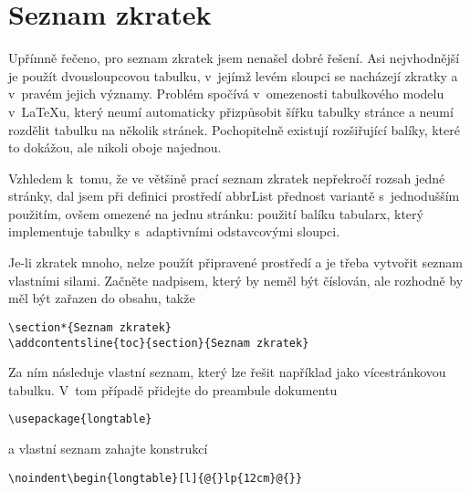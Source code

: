 \documentclass[FM,SP]{tulthesis}
\newcommand{\argument}[1]{{\ttfamily\color{\tulcolor}#1}}
\newenvironment{myquote}{\begin{list}{}{\setlength\leftmargin\parindent}\item[]}{\end{list}}
\newenvironment{listing}{\begin{myquote}\color{\tulcolor}}{\end{myquote}}
\begin{document}
\section{Seznam zkratek}\label{zkratky}

Upřímně řečeno, pro seznam zkratek jsem nenašel dobré řešení. Asi nejvhodnější
je použít dvousloupcovou tabulku, v~jejímž levém sloupci se nacházejí zkratky a
v~pravém jejich významy. Problém spočívá v~omezenosti tabulkového modelu
v~\LaTeX u, který neumí automaticky přizpůsobit šířku tabulky stránce a neumí
rozdělit tabulku na několik stránek. Pochopitelně existují rozšiřující balíky,
které to dokážou, ale nikoli oboje najednou.

Vzhledem k~tomu, že ve většině prací seznam zkratek nepřekročí rozsah jedné
stránky, dal jsem při definici prostředí \argument{abbrList} přednost variantě
s~jednodušším použitím, ovšem omezené na jednu stránku: použití balíku
\argument{tabularx}, který implementuje tabulky s~adaptivními odstavcovými
sloupci.

Je-li zkratek mnoho, nelze použít připravené prostředí a je třeba vytvořit
seznam vlastními silami. Začněte nadpisem, který by neměl být číslován, ale
rozhodně by měl být zařazen do obsahu, takže

\begin{listing}
\begin{verbatim}
\section*{Seznam zkratek}
\addcontentsline{toc}{section}{Seznam zkratek}
\end{verbatim}
\end{listing}

Za ním následuje vlastní seznam, který lze řešit například jako vícestránkovou
tabulku. V~tom případě přidejte do preambule dokumentu

\begin{listing}
\begin{verbatim}
\usepackage{longtable}
\end{verbatim}
\end{listing}

a vlastní seznam zahajte konstrukcí

\begin{listing}
\begin{verbatim}
\noindent\begin{longtable}[l]{@{}lp{12cm}@{}}
\end{verbatim}
\end{listing}
\end{document}
